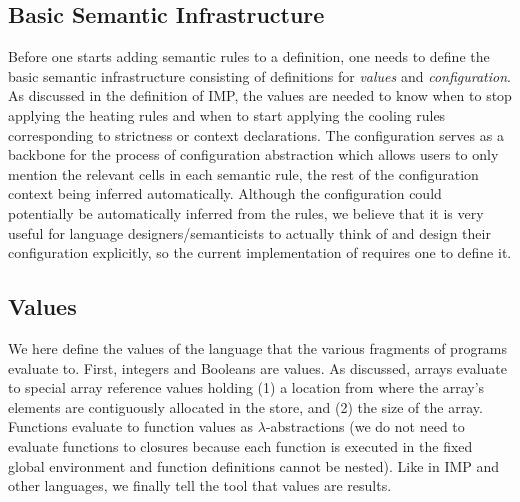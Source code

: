 \documentclass{article}
\begin{document}
\begin{kdefinition}
\begin{module}{}
\begin{kblock}[text]
 \section{Basic Semantic Infrastructure}
Before one starts adding semantic rules to a \K definition, one needs to
define the basic semantic infrastructure consisting of definitions for
{\em values} and {\em configuration}.  As discussed in the \K
definition of IMP, the values are needed to know when to stop applying
the heating rules and when to start applying the cooling rules
corresponding to strictness or context declarations.  The
configuration serves as a backbone for the process of configuration
abstraction which allows users to only mention the relevant cells in each
semantic rule, the rest of the configuration context being inferred
automatically.  Although the configuration could potentially be automatically
inferred from the rules, we believe that it is very useful for language
designers/semanticists to actually think of and design their configuration
explicitly, so the current implementation of \K requires one to define it. \end{kblock}
\begin{kblock}[text]
 \subsection{Values}
We here define the values of the language that the various fragments of
programs evaluate to.  First, integers and Booleans are values.  As discussed,
arrays evaluate to special array reference values holding (1) a location from
where the array's elements are contiguously allocated in the store, and
(2) the size of the array.  Functions evaluate to function values as
$\lambda$-abstractions (we do not need to evaluate functions to closures
because each function is executed in the fixed global environment and
function definitions cannot be nested).  Like in IMP and other
languages, we finally tell the tool that values are \K results. \end{kblock}

\begin{syntaxBlock}{}
\end{syntaxBlock}


\end{module}
\end{kdefinition}
\end{document}
